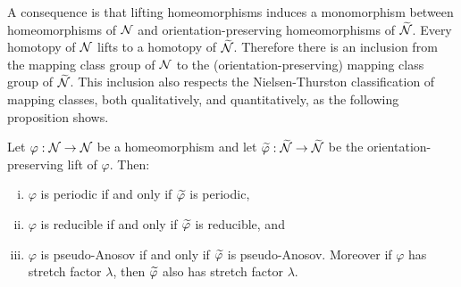 A consequence is that lifting homeomorphisms induces a monomorphism between homeomorphisms of $\mathcal{N}$ and orientation-preserving homeomorphisms of $\widetilde{\mathcal{N}}$.
Every homotopy of $\mathcal{N}$ lifts to a homotopy of $\widetilde{\mathcal{N}}$.
Therefore there is an inclusion from the mapping class group of $\mathcal{N}$ to the (orientation-preserving) mapping class group of $\widetilde{\mathcal{N}}$.
This inclusion also respects the Nielsen-Thurston classification of mapping classes, both qualitatively, and quantitatively, as the following proposition shows.
\begin{prop}
  \label{prop:2}
  Let $\varphi:\mathcal{N}\rightarrow\mathcal{N}$ be a homeomorphism and let $\widetilde{\varphi}:\widetilde{\mathcal{N}}\rightarrow\widetilde{\mathcal{N}}$ be the orientation-preserving lift of $\varphi$.  Then:
  \begin{enumerate}[(i)]
  \item $\varphi$ is periodic if and only if $\widetilde{\varphi}$ is periodic,
  \item $\varphi$ is reducible if and only if $\widetilde{\varphi}$ is reducible, and
  \item $\varphi$ is pseudo-Anosov if and only if $\widetilde{\varphi}$ is pseudo-Anosov.  Moreover if $\varphi$ has stretch factor $\lambda$, then $\widetilde{\varphi}$ also has stretch factor $\lambda$.
  \end{enumerate}
\end{prop}
